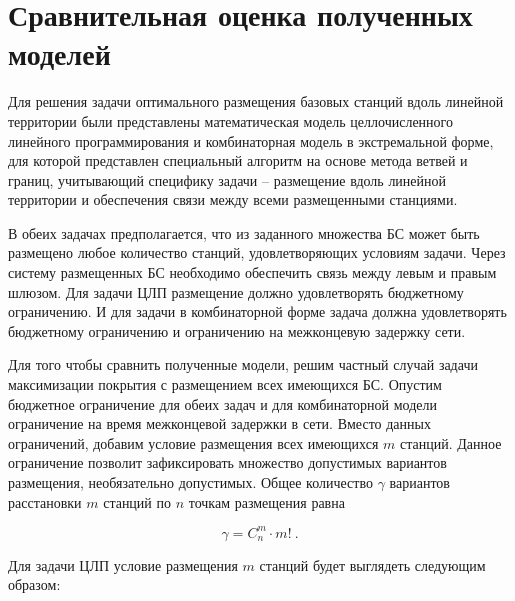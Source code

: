 


\section{Сравнительная оценка полученных моделей}
Для решения задачи оптимального размещения базовых станций вдоль линейной территории были представлены математическая модель целлочисленного линейного программирования и комбинаторная модель в экстремальной форме, для которой представлен специальный алгоритм на основе метода ветвей и границ, учитывающий специфику задачи -- размещение вдоль линейной территории и обеспечения связи между всеми размещенными станциями.

В обеих задачах предполагается, что из заданного множества БС может быть размещено любое количество станций, удовлетворяющих условиям задачи. Через систему размещенных БС необходимо обеспечить связь между левым и правым шлюзом. Для задачи ЦЛП размещение должно удовлетворять бюджетному ограничению. И для задачи в комбинаторной форме задача должна удовлетворять бюджетному ограничению и ограничению на межконцевую задержку сети.

Для того чтобы сравнить полученные модели, решим частный случай задачи максимизации покрытия с размещением всех имеющихся БС. Опустим бюджетное ограничение для обеих задач и для комбинаторной модели ограничение на время межконцевой задержки в сети. Вместо данных ограничений, добавим условие размещения всех имеющихся $m$ станций. Данное ограничение позволит зафиксировать множество допустимых вариантов размещения, необязательно допустимых. Общее количество $\gamma$ вариантов расстановки $m$ станций по $n$ точкам размещения равна 

\begin{equation}
  \label{eq:part2_gamma}
  \gamma = C^m_n \cdot m! \ .
\end{equation}

Для задачи ЦЛП условие размещения $m$ станций будет выглядеть следующим образом:


